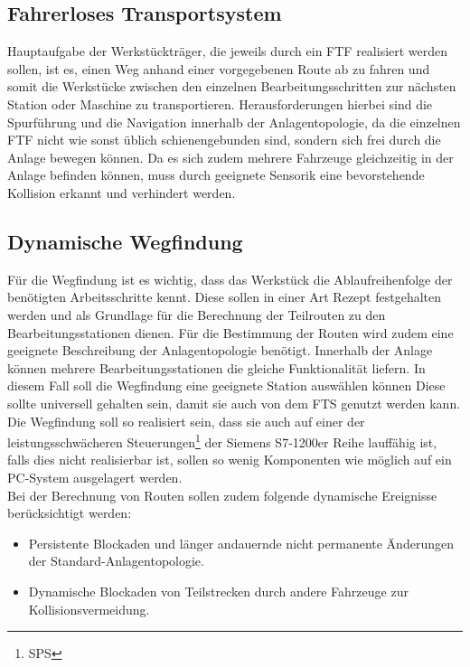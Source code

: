 \subsection{Fahrerloses Transportsystem}
	Hauptaufgabe der Werkstückträger, die jeweils durch ein \ac{FTF} realisiert werden sollen, ist es, einen Weg anhand einer vorgegebenen Route ab zu fahren und somit die Werkstücke zwischen den einzelnen Bearbeitungsschritten zur nächsten Station oder Maschine zu transportieren. Herausforderungen hierbei sind die Spurführung und die Navigation innerhalb der Anlagentopologie, da die einzelnen \ac{FTF} nicht wie sonst üblich schienengebunden sind, sondern sich frei durch die Anlage bewegen können. Da es sich zudem mehrere Fahrzeuge gleichzeitig in der Anlage befinden können, muss durch geeignete Sensorik eine bevorstehende Kollision erkannt und verhindert werden.
\subsection{Dynamische Wegfindung}
	\label{Aufgabenstellung_Pathfinding}
	Für die Wegfindung ist es wichtig, dass das Werkstück die Ablaufreihenfolge der benötigten Arbeitsschritte kennt. Diese sollen in einer Art Rezept festgehalten werden und als Grundlage für die Berechnung der Teilrouten zu den Bearbeitungsstationen dienen. Für die Bestimmung der Routen wird zudem eine geeignete Beschreibung der Anlagentopologie benötigt. Innerhalb der Anlage können mehrere Bearbeitungsstationen die gleiche Funktionalität liefern. In diesem Fall soll die Wegfindung eine geeignete Station auswählen können Diese sollte universell gehalten sein, damit sie auch von dem \ac{FTS} genutzt werden kann. Die Wegfindung soll so realisiert sein, dass sie auch auf einer der leistungsschwächeren Steuerungen\footnote{\ac{SPS}} der Siemens S7-1200er Reihe lauffähig ist, falls dies nicht realisierbar ist, sollen so wenig Komponenten wie möglich auf ein PC-System ausgelagert werden.
	\\ Bei der Berechnung von Routen sollen zudem folgende dynamische Ereignisse berücksichtigt werden:
	\begin{itemize}
		\item Persistente Blockaden und länger andauernde  nicht permanente Änderungen der Standard-Anlagentopologie.
		\item Dynamische Blockaden von Teilstrecken durch andere Fahrzeuge zur Kollisionsvermeidung.
	\end{itemize}
	
	

